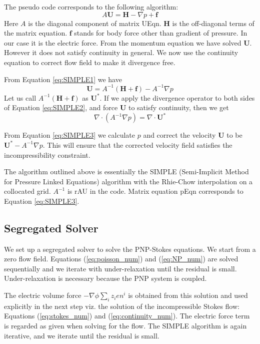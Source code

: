 The pseudo code corresponds to the following algorithm:
\begin{equation}
A \mathbf{U} = \mathbf{H} - \nabla p + \mathbf{f}
\label{eq:SIMPLE1}
\end{equation}
Here $A$ is the diagonal component of matrix \textsf{UEqn}. $\mathbf{H}$ is the off-diagonal terms of the matrix equation. $\mathbf{f}$ stands for body force other than gradient of pressure. In our case it is the electric force. From the momentum equation we have solved $\mathbf{U}$. However it does not satisfy continuity in general. We now use the continuity equation to correct flow field to make it divergence free.

From Equation \ref{eq:SIMPLE1} we have 
\begin{equation}
\mathbf{U} = A^{-1}(\mathbf{H}+\mathbf{f}) - A^{-1}\nabla p
\label{eq:SIMPLE2}
\end{equation}
Let us call $A^{-1}(\mathbf{H}+\mathbf{f})$ as $\mathbf{U}^*$. If we apply the divergence operator to both sides of Equation \ref{eq:SIMPLE2}, and force $\mathbf{U}$ to satisfy continuity, then we get
\begin{equation}
\nabla \cdot \left(A^{-1}\nabla p\right) = \nabla \cdot \mathbf{U}^*
\label{eq:SIMPLE3}
\end{equation}

From Equation \ref{eq:SIMPLE3} we calculate $p$ and correct the velocity $\mathbf{U}$ to be $\mathbf{U}^* - A^{-1}\nabla p$. This will ensure that the corrected velocity field satisfies the incompressibility constraint.

The algorithm outlined above is essentially the SIMPLE (Semi-Implicit Method for Pressure Linked Equations) algorithm with the Rhie-Chow interpolation on a collocated grid. $A^{-1}$ is \textsf{rAU} in the code. Matrix equation \textsf{pEqn} corresponds to Equation \ref{eq:SIMPLE3}.

\subsection{Segregated Solver}
We set up a segregated solver to solve the PNP-Stokes equations. We start from a zero flow field. Equations  (\ref{eq:poisson_num}) and (\ref{eq:NP_num}) are solved sequentially and we iterate with under-relaxation until the residual is small. Under-relaxation is necessary because the PNP system is coupled. 

The electric volume force $- \nabla \phi\sum_i z_ien^i $ is obtained from this solution and used explicitly in the next step viz. the solution of the incompressible Stokes flow: Equations (\ref{eq:stokes_num}) and (\ref{eq:continuity_num}). The electric force term is regarded as given when solving for the flow. The SIMPLE algorithm is again iterative, and we iterate until the residual is small.

